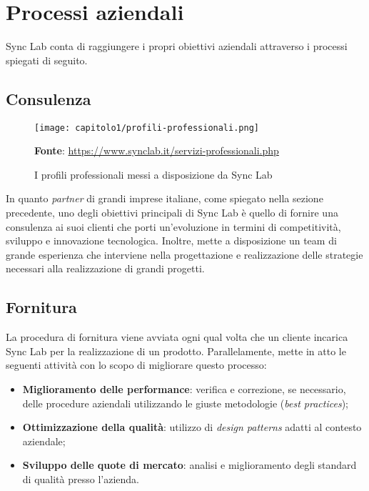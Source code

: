 
\section{Processi aziendali}
Sync Lab conta di raggiungere i propri obiettivi aziendali attraverso i processi spiegati di seguito.

\subsection{Consulenza}

\begin{figure}[!h]
  \centering
  \texttt{[image: capitolo1/profili-professionali.png]}
  \caption{I profili professionali messi a disposizione da Sync Lab}
  \textbf{Fonte}: \href{https://www.synclab.it/servizi-professionali.php}{https://www.synclab.it/servizi-professionali.php}
\end{figure}

In quanto \textit{partner} di grandi imprese italiane, come spiegato nella sezione precedente, uno degli obiettivi principali di Sync Lab è quello di fornire una consulenza ai suoi clienti che porti un'evoluzione in termini di competitività, sviluppo e innovazione tecnologica. Inoltre, mette a disposizione un team di grande esperienza che interviene nella progettazione e realizzazione delle strategie necessari alla realizzazione di grandi progetti.

\subsection{Fornitura}
La procedura di fornitura viene avviata ogni qual volta che un cliente incarica Sync Lab per la realizzazione di un prodotto. Parallelamente, mette in atto le seguenti attività con lo scopo di migliorare questo processo:
\begin{itemize}
  \item \textbf{Miglioramento delle performance}: verifica e correzione, se necessario, delle procedure aziendali utilizzando le giuste metodologie (\textit{best practices});
  \item \textbf{Ottimizzazione della qualità}: utilizzo di \textit{design patterns} adatti al contesto aziendale;
  \item \textbf{Sviluppo delle quote di mercato}: analisi e miglioramento degli standard di qualità presso l'azienda.
\end{itemize} 

